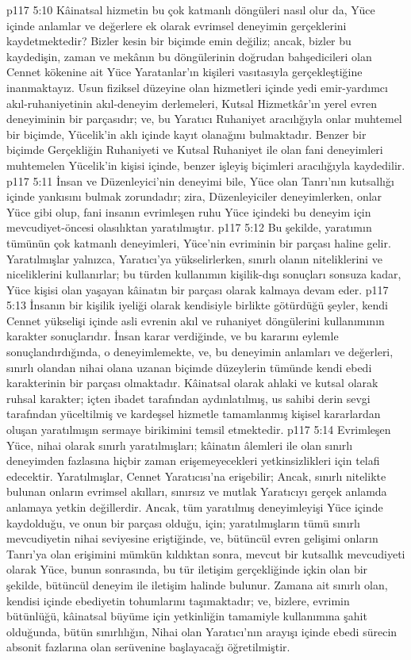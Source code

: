 \vs p117 5:10 Kâinatsal hizmetin bu çok katmanlı döngüleri nasıl olur da, Yüce içinde anlamlar ve değerlere ek olarak evrimsel deneyimin gerçeklerini kaydetmektedir? Bizler kesin bir biçimde emin değiliz; ancak, bizler bu kaydedişin, zaman ve mekânın bu döngülerinin doğrudan bahşedicileri olan Cennet kökenine ait Yüce Yaratanlar’ın kişileri vasıtasıyla gerçekleştiğine inanmaktayız. Usun fiziksel düzeyine olan hizmetleri içinde yedi emir\hyp{}yardımcı akıl\hyp{}ruhaniyetinin akıl\hyp{}deneyim derlemeleri, Kutsal Hizmetkâr’ın yerel evren deneyiminin bir parçasıdır; ve, bu Yaratıcı Ruhaniyet aracılığıyla onlar muhtemel bir biçimde, Yücelik’in aklı içinde kayıt olanağını bulmaktadır. Benzer bir biçimde Gerçekliğin Ruhaniyeti ve Kutsal Ruhaniyet ile olan fani deneyimleri muhtemelen Yücelik’in kişisi içinde, benzer işleyiş biçimleri aracılığıyla kaydedilir.
\vs p117 5:11 İnsan ve Düzenleyici’nin deneyimi bile, Yüce olan Tanrı’nın kutsallığı içinde yankısını bulmak zorundadır; zira, Düzenleyiciler deneyimlerken, onlar Yüce gibi olup, fani insanın evrimleşen ruhu Yüce içindeki bu deneyim için mevcudiyet\hyp{}öncesi olasılıktan yaratılmıştır.
\vs p117 5:12 Bu şekilde, yaratımın tümünün çok katmanlı deneyimleri, Yüce’nin evriminin bir parçası haline gelir. Yaratılmışlar yalnızca, Yaratıcı’ya yükselirlerken, sınırlı olanın niteliklerini ve niceliklerini kullanırlar; bu türden kullanımın kişilik\hyp{}dışı sonuçları sonsuza kadar, Yüce kişisi olan yaşayan kâinatın bir parçası olarak kalmaya devam eder.
\vs p117 5:13 İnsanın bir kişilik iyeliği olarak kendisiyle birlikte götürdüğü şeyler, kendi Cennet yükselişi içinde asli evrenin akıl ve ruhaniyet döngülerini kullanımının karakter sonuçlarıdır. İnsan karar verdiğinde, ve bu kararını eylemle sonuçlandırdığında, o deneyimlemekte, ve, bu deneyimin anlamları ve değerleri, sınırlı olandan nihai olana uzanan biçimde düzeylerin tümünde kendi ebedi karakterinin bir parçası olmaktadır. Kâinatsal olarak ahlaki ve kutsal olarak ruhsal karakter; içten ibadet tarafından aydınlatılmış, us sahibi derin sevgi tarafından yüceltilmiş ve kardeşsel hizmetle tamamlanmış kişisel kararlardan oluşan yaratılmışın sermaye birikimini temsil etmektedir.
\vs p117 5:14 Evrimleşen Yüce, nihai olarak sınırlı yaratılmışları; kâinatın âlemleri ile olan sınırlı deneyimden fazlasına hiçbir zaman erişemeyecekleri yetkinsizlikleri için telafi edecektir. Yaratılmışlar, Cennet Yaratıcısı’na erişebilir; Ancak, sınırlı nitelikte bulunan onların evrimsel akılları, sınırsız ve mutlak Yaratıcıyı gerçek anlamda anlamaya yetkin değillerdir. Ancak, tüm yaratılmış deneyimleyişi Yüce içinde kaydolduğu, ve onun bir parçası olduğu, için; yaratılmışların tümü sınırlı mevcudiyetin nihai seviyesine eriştiğinde, ve, bütüncül evren gelişimi onların Tanrı’ya olan erişimini mümkün kıldıktan sonra, mevcut bir kutsallık mevcudiyeti olarak Yüce, bunun sonrasında, bu tür iletişim gerçekliğinde içkin olan bir şekilde, bütüncül deneyim ile iletişim halinde bulunur. Zamana ait sınırlı olan, kendisi içinde ebediyetin tohumlarını taşımaktadır; ve, bizlere, evrimin bütünlüğü, kâinatsal büyüme için yetkinliğin tamamiyle kullanımına şahit olduğunda, bütün sınırlılığın, Nihai olan Yaratıcı’nın arayışı içinde ebedi sürecin absonit fazlarına olan serüvenine başlayacağı öğretilmiştir.
